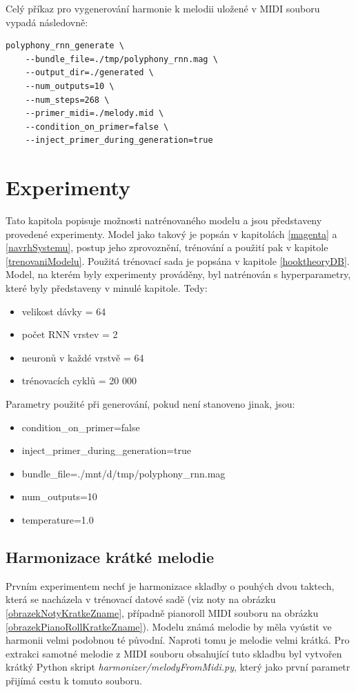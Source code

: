 Celý příkaz pro vygenerování harmonie k melodii
uložené v MIDI souboru vypadá následovně:

\begin{verbatim}
polyphony_rnn_generate \
    --bundle_file=./tmp/polyphony_rnn.mag \
    --output_dir=./generated \
    --num_outputs=10 \
    --num_steps=268 \
    --primer_midi=./melody.mid \
    --condition_on_primer=false \
    --inject_primer_during_generation=true    
\end{verbatim}

\chapter{Experimenty}
Tato kapitola popisuje možnosti natrénovaného modelu 
a jsou představeny provedené experimenty.
Model jako takový je popsán v kapitolách \ref{magenta} a \ref{navrhSystemu},
postup jeho zprovoznění, trénování a použití pak v kapitole \ref{trenovaniModelu}.
Použitá trénovací sada je popsána v kapitole \ref{hooktheoryDB}.
Model, na kterém byly experimenty prováděny, 
byl natrénován s hyperparametry, které byly představeny v minulé kapitole.
Tedy:
\begin{itemize}
    \item velikost dávky = 64
    \item počet RNN vrstev = 2
    \item neuronů v každé vrstvě = 64
    \item trénovacích cyklů = 20 000
\end{itemize}
\par
Parametry použité při generování, pokud není stanoveno jinak, jsou:
\begin{itemize}
    \item condition\_on\_primer=false
    \item inject\_primer\_during\_generation=true
    \item bundle\_file=./mnt/d/tmp/polyphony\_rnn.mag
    \item num\_outputs=10 
    \item temperature=1.0
\end{itemize}

\section{Harmonizace krátké melodie}
Prvním experimentem nechť je harmonizace skladby o pouhých dvou taktech,
která se nacházela v trénovací datové sadě 
(viz noty na obrázku \ref{obrazekNotyKratkeZname},
případně pianoroll MIDI souboru na obrázku \ref{obrazekPianoRollKratkeZname}).
Modelu známá melodie by měla vyústit ve harmonii velmi podobnou té původní.
Naproti tomu je melodie velmi krátká.
Pro extrakci samotné melodie z MIDI souboru obsahující tuto skladbu 
byl vytvořen krátký Python skript \emph{harmonizer/melodyFromMidi.py}, 
který jako první parametr přijímá cestu k tomuto souboru.

